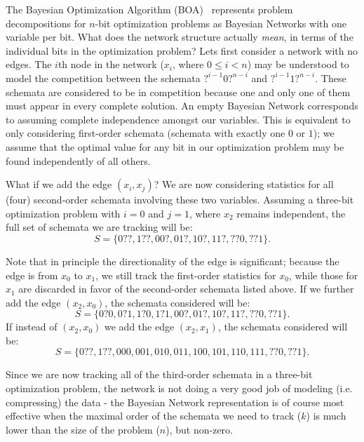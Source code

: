 \documentclass[letterpaper]{article}
\begin{document}
The Bayesian Optimization Algorithm (BOA)~\cite{BOA} represents problem
decompositions for $n$-bit optimization problems as Bayesian Networks with one
variable per bit. What does the network structure actually \emph{mean}, in
terms of the individual bits in the optimization problem? Lets first consider a
network with no edges. The $i$th node in the network ($x_i$, where $0 \leq i <
n$) may be understood to model the competition between the schemata
$?^{i-1}0?^{n-i}$ and $?^{i-1}1?^{n-i}$. These schemata are considered to be in
competition because one and only one of them must appear in every complete
solution. An empty Bayesian Network corresponds to assuming complete
independence amongst our variables. This is equivalent to only considering
first-order schemata (schemata with exactly one $0$ or $1$); we assume that the
optimal value for any bit in our optimization problem may be found
independently of all others.

What if we add the edge $(x_i,x_j)$? We are now considering statistics
for all (four) second-order schemata involving these two variables. Assuming a
three-bit optimization problem with $i=0$ and $j=1$, where $x_2$ remains
independent, the full set of schemata we are tracking will be:
\begin{equation}
  S = \{0??, 1??, 00?, 01?, 10?, 11?, ??0, ??1\} .
\end{equation}

Note that in principle the directionality of the edge is significant; because
the edge is from $x_0$ to $x_1$, we still track the first-order statistics for
$x_0$, while those for $x_1$ are discarded in favor of the second-order
schemata listed above. If we further add the edge $(x_2,x_0)$, the schemata
considered will be:
\begin{equation}
  S = \{0?0, 0?1, 1?0, 1?1, 00?, 01?, 10?, 11?, ??0, ??1\}.
\end{equation}
If instead of $(x_2,x_0)$ we add the edge $(x_2,x_1)$, the schemata considered
will be:
\begin{equation}
  S = \{0??, 1??, 000, 001, 010, 011, 100, 101, 110, 111, ??0, ??1\}.
\end{equation}

Since we are now tracking all of the third-order schemata in a three-bit
optimization problem, the network is not doing a very good job of modeling
(i.e. compressing) the data - the Bayesian Network representation is of course
most effective when the maximal order of the schemata we need to track ($k$) is
much lower than the size of the problem ($n$), but non-zero.
\end{document}
